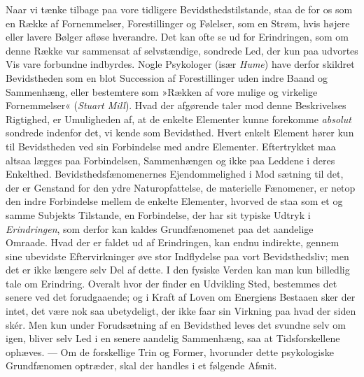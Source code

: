 \documentclass[12pt,a4paper,openany]{book}
\newcommand{\opage}[1]{\marginnote{\footnotesize\textit{[#1]}}}
\begin{document}
Naar vi tænke tilbage paa vore tidligere Bevidsthedstilstande, staa de
for os som en Række af Fornemmelser, Forestillinger og Følelser, som en
Strøm, hvis højere eller lavere Bølger afløse hverandre. Det kan ofte se
ud for Erindringen, som om denne Række var sammensat af selvstændige,
sondrede Led, der kun paa udvortes Vis vare forbundne indbyrdes. Nogle
Psykologer (især \emph{Hume}) have derfor skildret Bevidstheden som en
blot Succession af Forestillinger uden indre Baand og Sammenhæng, eller
bestemtere som »Rækken af vore mulige og virkelige Fornemmelser«
(\emph{Stuart Mill}). Hvad der afgørende taler mod denne Beskrivelses
Rigtighed, er Umuligheden af, at de enkelte Elementer kunne forekomme
\emph{absolut} sondrede indenfor det, vi kende som Bevidsthed. Hvert
enkelt Element hører kun til Bevidstheden ved sin Forbindelse med andre
Elementer. Eftertrykket maa altsaa lægges paa Forbindelsen, Sammenhængen
og ikke paa Leddene i deres Enkelthed. Bevidsthedsfænomenernes
Ejendommelighed i Mod%
\opage{58}sætning til det, der er Genstand for den ydre Naturopfattelse,
de materielle Fænomener, er netop den indre Forbindelse mellem de
enkelte Elementer, hvorved de staa som et og samme Subjekts Tilstande,
en Forbindelse, der har sit typiske Udtryk i \emph{Erindringen}, som
derfor kan kaldes Grundfænomenet paa det aandelige Omraade. Hvad der er
faldet ud af Erindringen, kan endnu indirekte, gennem sine ubevidste
Eftervirkninger øve stor Indflydelse paa vort Bevidsthedsliv; men det er
ikke længere selv Del af dette. I den fysiske Verden kan man kun
billedlig tale om Erindring. Overalt hvor der finder en Udvikling Sted,
bestemmes det senere ved det forudgaaende; og i Kraft af Loven om
Energiens Bestaaen sker der intet, det være nok saa ubetydeligt, der
ikke faar sin Virkning paa hvad der siden skér. Men kun under
Forudsætning af en Bevidsthed leves det svundne selv om igen, bliver
selv Led i en senere aandelig Sammenhæng, saa at Tidsforskellene
ophæves. --- Om de forskellige Trin og Former, hvorunder dette
psykologiske Grundfænomen optræder, skal der handles i et følgende
Afsnit.
\end{document}
